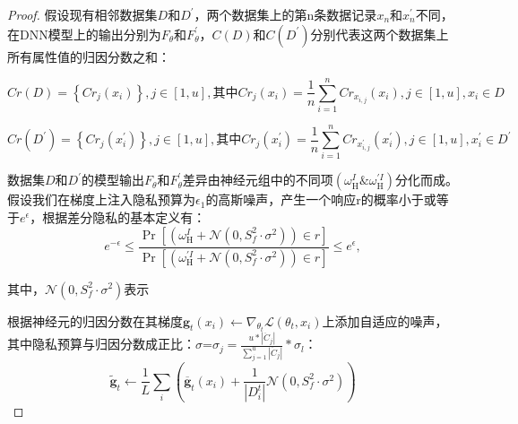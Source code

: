 \begin{proof}
假设现有相邻数据集$D$和$D^{\prime}$，两个数据集上的第n条数据记录$x_{n}$和$x_{n}^{\prime}$不同，在DNN模型上的输出分别为$F_{\theta}$和$F_{\theta}^{\prime}$，$C(D)$和$C(D^{\prime})$分别代表这两个数据集上所有属性值的归因分数之和：

\begin{equation}
Cr(D)=\left\{Cr_{j}\left(x_{i}\right)\right\}, j \in[1, u], \text {其中} Cr_{j}\left(x_{i}\right)=\frac{1}{n} \sum_{i=1}^{n} Cr_{x_{i, j}}\left(x_{i}\right), j \in[1, u], x_{i} \in D
\end{equation}

\begin{equation}
Cr\left(D^{\prime}\right)=\left\{Cr_{j}\left(x_{i}^{\prime}\right)\right\}, j \in[1, u], \text {其中} Cr_{j}\left(x_{i}^{\prime}\right)=\frac{1}{n} \sum_{i=1}^{n} Cr_{x_{i, j}^{\prime}}\left(x_{i}^{\prime}\right), j \in[1, u], x_{i}^{\prime} \in D^{\prime}
\end{equation}

数据集$D$和$D^{\prime}$的模型输出$F_{\theta}$和$F_{\theta}^{\prime}$差异由神经元组中的不同项$\left(\omega_{\mathrm{H}}^{I} \& \omega_{\mathrm{H}}^{\prime I}\right)$分化而成。假设我们在梯度上注入隐私预算为$\epsilon_{1}$的高斯噪声，产生一个响应r的概率小于或等于$e^{\epsilon}$，根据差分隐私的基本定义有：
$$
e^{-\epsilon} \leq \frac{\operatorname{Pr}\left[\left(\omega_{\mathrm{H}}^{I}+\mathcal{N}\left(0, S_{f}^{2} \cdot \sigma^{2}\right)\right) \in r\right]}{\operatorname{Pr}\left[\left(\omega_{\mathrm{H}}^{\prime I}+\mathcal{N}\left(0, S_{f}^{2} \cdot \sigma^{2}\right)\right) \in r\right]} \leq e^{\epsilon},
$$

其中，$\mathcal{N}\left(0, S_{f}^{2} \cdot \sigma^{2}\right)$表示

根据神经元的归因分数在其梯度$\mathbf{g}_{t}\left(x_{i}\right) \leftarrow \nabla_{\theta_{t}} \mathcal{L}\left(\theta_{t}, x_{i}\right)$上添加自适应的噪声，其中隐私预算与归因分数成正比：$\sigma$=$\sigma_{j}=\frac{u *\left|\ddot{C}_{j}\right|}{\sum_{j=1}^{u}\left|\ddot{C}_{j}\right|} * \sigma_{l}$：
\begin{equation}\label{eq:神经网络加噪3}
\tilde{\mathbf{g}}_{t} \leftarrow \frac{1}{L} \sum_{i}\left(\overline{\mathbf{g}}_{t}\left(x_{i}\right)+\frac{1}{\left|D_{i}^{t}\right|}\mathcal{N}\left(0, S_{f}^{2} \cdot \sigma^{2}\right)\right)
\end{equation}


\end{proof}
